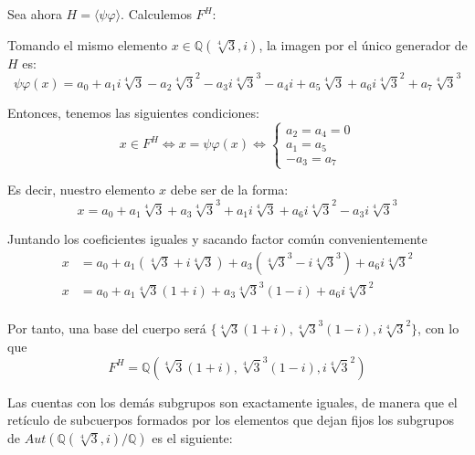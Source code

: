 \documentclass[a4paper, 11pt]{article}
\begin{document}
\begin{solucion}
\begin{apartado}
          Sea ahora $H=\langle \psi\varphi \rangle$. Calculemos $F^H$:

          Tomando el mismo elemento $x \in \mathbb{Q}(\sqrt[4]{3},i)$, la imagen por el único generador de $H$ es:
          \[
          \psi\varphi(x) = a_0 + a_1 i\sqrt[4]{3} - a_2 \sqrt[4]{3}^2 - a_3 i\sqrt[4]{3}^3 - a_4 i + a_5 \sqrt[4]{3} + a_6 i \sqrt[4]{3}^2 + a_7 \sqrt[4]{3}^3
          \]

          Entonces, tenemos las siguientes condiciones:
          \[
          x \in F^H \iff x = \psi\varphi(x) \iff
          \begin{cases}
              a_2 = a_4 = 0\\
              a_1 = a_5\\
              -a_3 = a_7
          \end{cases}
          \]

          Es decir, nuestro elemento $x$ debe ser de la forma:
          \[
            x = a_0 + a_1 \sqrt[4]{3} + a_3 \sqrt[4]{3}^3 + a_1 i \sqrt[4]{3} + a_6 i \sqrt[4]{3}^2 - a_3 i \sqrt[4]{3}^3
          \]

          Juntando los coeficientes iguales y sacando factor común convenientemente
          \begin{align*}
            x &= a_0 + a_1(\sqrt[4]{3} + i \sqrt[4]{3}) + a_3(\sqrt[4]{3}^3 - i \sqrt[4]{3}^3) + a_6 i \sqrt[4]{3}^2\\
            x &= a_0 + a_1\sqrt[4]{3}(1 + i) + a_3\sqrt[4]{3}^3(1 - i) + a_6 i \sqrt[4]{3}^2\\
          \end{align*}

          Por tanto, una base del cuerpo será $\{\sqrt[4]{3}(1 + i), \sqrt[4]{3}^3(1 - i), i\sqrt[4]{3}^2\}$, con lo que
          \[
            F^H = \mathbb{Q}(\sqrt[4]{3}(1 + i), \sqrt[4]{3}^3(1 - i), i\sqrt[4]{3}^2)
          \]

          Las cuentas con los demás subgrupos son exactamente iguales, de manera que el retículo de subcuerpos formados por los elementos que dejan fijos los subgrupos de $Aut(\mathbb{Q}(\sqrt[4]{3},i)/\mathbb{Q})$ es el siguiente:

          \vspace{1 cm}

          \centering
\end{apartado}
\end{solucion}
\end{document}
